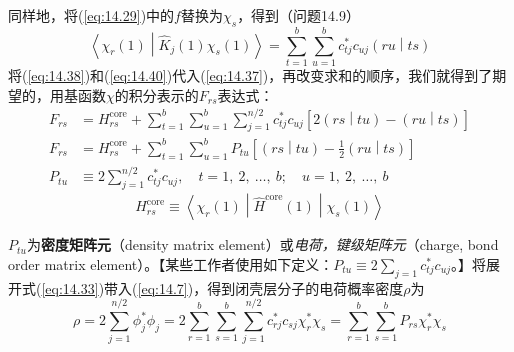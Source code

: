     同样地，将(\ref{eq:14.29})中的$f$替换为$\chi_s$，得到（问题14.9）
    \begin{equation}
        \left\langle \chi_r \left(1\right) \middle| \hat{K}_j \left(1\right) \chi_s \left(1\right) \right\rangle = \sum_{t=1}^{b} \sum_{u=1}^{b} c_{tj}^* c_{uj} \left(ru \middle| ts\right)
        \label{eq:14.40}
    \end{equation}
    将(\ref{eq:14.38})和(\ref{eq:14.40})代入(\ref{eq:14.37})，再改变求和的顺序，我们就得到了期望的，用基函数$\chi$的积分表示的$F_{rs}$表达式：
    \begin{align}
        F_{rs} &= H^{\text{core}}_{rs} + \sum_{t=1}^{b} \sum_{u=1}^{b} \sum_{j=1}^{n/2} c_{tj}^* c_{uj} \left[ 2\left(rs \middle| tu\right) - \left(ru \middle| ts\right) \right] \nonumber \\
        F_{rs} &= H^{\text{core}}_{rs} + \sum_{t=1}^{b} \sum_{u=1}^{b} P_{tu} \left[ \left(rs \middle| tu\right) - \frac{1}{2}\left(ru \middle| ts\right) \right] \label{eq:14.41} \\
        P_{tu} &\equiv 2\sum_{j=1}^{n/2} c_{tj}^* c_{uj}, \quad t = 1,\:2,\:\ldots,\:b; \quad u = 1,\:2,\:\ldots,\:b \label{eq:14.42}
    \end{align}
    \begin{equation*}
        H^{\text{core}}_{rs} \equiv \left\langle \chi_r \left(1\right) \middle| \hat{H}^{\text{core}} \left(1\right) \middle| \chi_s \left(1\right) \right\rangle
    \end{equation*}

    $P_{tu}$为\textbf{密度矩阵元}（density matrix element）或\textit{电荷，键级矩阵元}（charge, bond order matrix element）。【某些工作者使用如下定义：$P_{tu} \equiv 2\sum_{j=1} c_{tj}^* c_{uj}$。】将展开式(\ref{eq:14.33})带入(\ref{eq:14.7})，得到闭壳层分子的电荷概率密度$\rho$为
    \begin{equation}
        \rho = 2 \sum_{j=1}^{n/2} \phi_j^* \phi_j = 2 \sum_{r=1}^{b} \sum_{s=1}^{b} \sum_{j=1}^{n/2} c_{rj}^* c_{sj} \chi_r^* \chi_s = \sum_{r=1}^{b} \sum_{s=1}^{b} P_{rs} \chi_r^* \chi_s
        \label{eq:14.43}
    \end{equation}


